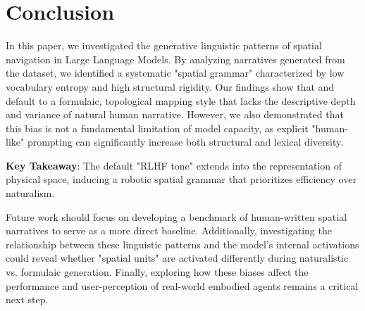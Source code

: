 \section{Conclusion}
\label{sec:conclusion}

In this paper, we investigated the generative linguistic patterns of spatial navigation in Large Language Models. By analyzing narratives generated from the \babi dataset, we identified a systematic "spatial grammar" characterized by low vocabulary entropy and high structural rigidity. Our findings show that \gpto and \gptom default to a formulaic, topological mapping style that lacks the descriptive depth and variance of natural human narrative. However, we also demonstrated that this bias is not a fundamental limitation of model capacity, as explicit "human-like" prompting can significantly increase both structural and lexical diversity.

{\bf Key Takeaway}: The default "RLHF tone" extends into the representation of physical space, inducing a robotic spatial grammar that prioritizes efficiency over naturalism.

Future work should focus on developing a benchmark of human-written spatial narratives to serve as a more direct baseline. Additionally, investigating the relationship between these linguistic patterns and the model's internal activations could reveal whether "spatial units" are activated differently during naturalistic vs. formulaic generation. Finally, exploring how these biases affect the performance and user-perception of real-world embodied agents remains a critical next step.
